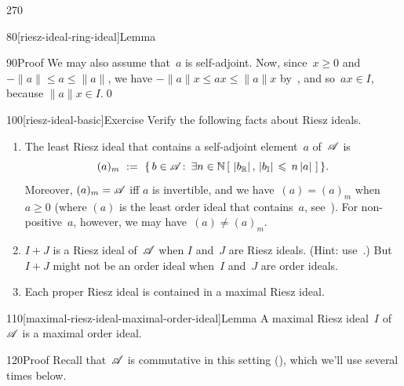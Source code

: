 \begin{parsec}{270}
\begin{point}{80}[riesz-ideal-ring-ideal]{Lemma}
\begin{point}{90}{Proof}
We may also assume that~$a$ is self-adjoint.
Now, since~$x\geq 0$ and $-\|a\|\leq a\leq \|a\|$,
we have $-\|a\|x \leq ax\leq \|a\|x$
by~,
and so~$ax\in I$,
because $\|a\|x\in I$.\qed
\end{point}
\end{point}
\begin{point}{100}[riesz-ideal-basic]{Exercise}%
Verify the following facts about Riesz ideals.
\begin{enumerate}
\item
The least Riesz ideal that contains a self-adjoint element~$a$
of~$\mathscr{A}$ is
\begin{equation*}
(a)_m\ :=\ \{\,b\in \mathscr{A}\colon\, 
\exists n\in \mathbb{N}\,[\ \left|b_{\mathbb{R}}\right|,\,\left|b_{\mathbb{I}}\right|
\,\leqslant\, n\left|a\right| \ ]\,\}.
\end{equation*}
Moreover,  $(a)_m=\mathscr{A}$ iff $a$ is invertible,
and we have~$(a)=(a)_m$ when~$a\geq 0$
(where $(a)$ is the least order ideal that contains~$a$,
see~).
For non-positive~$a$, however, we may have~$(a)\neq (a)_m$.
\item
$I+J$ is a Riesz ideal of~$\mathscr{A}$
when $I$ and~$J$ are Riesz ideals. (Hint: use~.)
But~$I+J$ might not be an order ideal
when~$I$ and~$J$ are order ideals.

\item
Each proper Riesz ideal is contained in a maximal Riesz ideal.
\end{enumerate}%
\spacingfix%
\end{point}%
\begin{point}{110}[maximal-riesz-ideal-maximal-order-ideal]{Lemma}%
A maximal Riesz ideal~$I$ of~$\mathscr{A}$
is a maximal order ideal.
\begin{point}{120}{Proof}%
Recall that~$\mathscr{A}$ is commutative
in this setting (),
which we'll use several times below.


\end{point}
\end{point}
\end{parsec}
